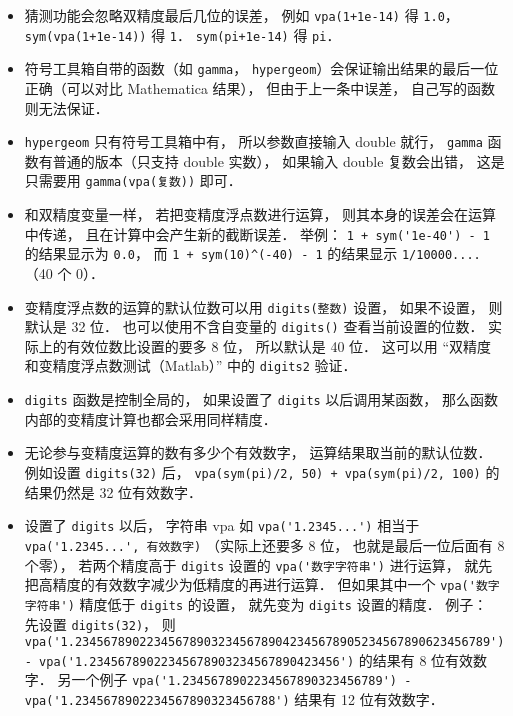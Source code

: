 \begin{itemize}
\item 猜测功能会忽略双精度最后几位的误差， 例如 \verb|vpa(1+1e-14)| 得 \verb|1.0|， \verb|sym(vpa(1+1e-14))| 得 \verb|1|． \verb|sym(pi+1e-14)| 得 \verb|pi|．

\item 符号工具箱自带的函数（如 \verb|gamma|， \verb|hypergeom|）会保证输出结果的最后一位正确（可以对比 Mathematica 结果）， 但由于上一条中误差， 自己写的函数则无法保证．

\item \verb|hypergeom| 只有符号工具箱中有， 所以参数直接输入 double 就行， \verb|gamma| 函数有普通的版本（只支持 double 实数）， 如果输入 double 复数会出错， 这是只需要用 \verb|gamma(vpa(复数))| 即可．

\item 和双精度变量一样， 若把变精度浮点数进行运算， 则其本身的误差会在运算中传递， 且在计算中会产生新的截断误差． 举例： \verb|1 + sym('1e-40') - 1| 的结果显示为 \verb|0.0|， 而 \verb|1 + sym(10)^(-40) - 1| 的结果显示 \verb|1/10000....|（40 个 0）．

\item 变精度浮点数的运算的默认位数可以用 \verb|digits(整数)| 设置， 如果不设置， 则默认是 32 位． 也可以使用不含自变量的 \verb|digits()| 查看当前设置的位数． 实际上的有效位数比设置的要多 8 位， 所以默认是 40 位． 这可以用 “双精度和变精度浮点数测试（Matlab）” 中的 \verb|digits2| 验证．

\item \verb|digits| 函数是控制全局的， 如果设置了 \verb|digits| 以后调用某函数， 那么函数内部的变精度计算也都会采用同样精度．

\item 无论参与变精度运算的数有多少个有效数字， 运算结果取当前的默认位数． 例如设置 \verb|digits(32)| 后， \verb|vpa(sym(pi)/2, 50) + vpa(sym(pi)/2, 100)| 的结果仍然是 32 位有效数字．

\item 设置了 \verb|digits| 以后， 字符串 vpa 如 \verb|vpa('1.2345...')| 相当于 \verb|vpa('1.2345...', 有效数字)| （实际上还要多 8 位， 也就是最后一位后面有 8 个零）， 若两个精度高于 \verb|digits| 设置的 \verb|vpa('数字字符串')| 进行运算， 就先把高精度的有效数字减少为低精度的再进行运算． 但如果其中一个 \verb|vpa('数字字符串')| 精度低于 \verb|digits| 的设置， 就先变为 \verb|digits| 设置的精度． 例子： 先设置 \verb|digits(32)|， 则 \verb|vpa('1.2345678902234567890323456789042345678905234567890623456789') - vpa('1.23456789022345678903234567890423456')| 的结果有 8 位有效数字． 另一个例子 \verb|vpa('1.2345678902234567890323456789') - vpa('1.2345678902234567890323456788')| 结果有 12 位有效数字．


\end{itemize}
